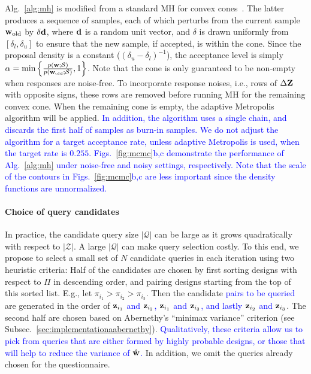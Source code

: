 \documentclass[onecolumn,11pt]{article}
\newcommand{\highlight}[1]{{\textcolor{blue}{{#1}}}}
\newcommand{\highlight}[1]{{{#1}}}
\begin{document}
Alg.~\ref{alg:mh} is modified from a standard MH for convex cones~\cite{boneh1979constraints}. The latter produces a sequence of samples, each of which perturbs from the current sample ${\bf w}_{\text{old}}$ by $\delta {\bf d}$, where ${\bf d}$ is a random unit vector, and $\delta$ is drawn uniformly from $[\delta_l, \delta_u]$ to ensure that the new sample, if accepted, is within the cone. Since the proposal density is a constant ($(\delta_u-\delta_l)^{-1}$), the acceptance level is simply $\alpha = \min\left\{\frac{p({\bf w};\mathcal{S})}{p({\bf w}_{\text{old}};\mathcal{S})},1\right\}$. Note that the cone is only guaranteed to be non-empty when responses are noise-free. To incorporate response noises, i.e., rows of $\Delta {\bf Z}$ with opposite signs, these rows are removed before running MH for the remaining convex cone. When the remaining cone is empty, the adaptive Metropolis algorithm will be applied. \highlight{In addition, the algorithm uses a single chain, and discards the first half of samples as burn-in samples. We do not adjust the algorithm for a target acceptance rate, unless adaptive Metropolis is used, when the target rate is $0.255$. Figs.~\ref{fig:mcmc}b,c demonstrate the performance of Alg.~\ref{alg:mh} under noise-free and noisy settings, respectively. Note that the scale of the contours in Figs.~\ref{fig:mcmc}b,c are less important since the density functions are unnormalized.}  

\paragraph{Choice of query candidates} In practice, the candidate query size $|\mathcal{Q}|$ can be large as it grows quadratically with respect to $|\mathcal{Z}|$. A large $|\mathcal{Q}|$ can make query selection costly. To this end, we propose to select a small set of $N$ candidate queries in each iteration using two heuristic criteria: Half of the candidates are chosen by first sorting designs with respect to $\Pi$ in descending order, and pairing designs starting from the top of this sorted list. E.g., let $\pi_{i_1}>\pi_{i_2}>\pi_{i_3}$. Then the candidate \highlight{pairs to be queried} are generated in the order of \highlight{${\bf z}_{i_1}$ and ${\bf z}_{i_2}$, ${\bf z}_{i_1}$ and ${\bf z}_{i_3}$, and lastly ${\bf z}_{i_2}$ and ${\bf z}_{i_3}$}. The second half are chosen based on Abernethy's ``minimax variance'' criterion (see Subsec.~\ref{sec:implementationaabernethy}). \highlight{Qualitatively, these criteria allow us to pick from queries that are either formed by highly probable designs, or those that will help to reduce the variance of $\hat{\bf w}$.} In addition, we omit the queries already chosen for the questionnaire.
\end{document}
